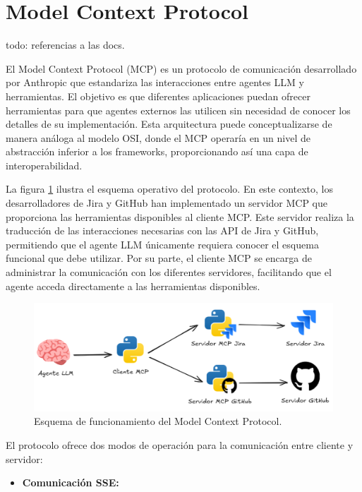 \section{Model Context Protocol}
todo: referencias a las docs.

El Model Context Protocol (MCP) es un protocolo de comunicación desarrollado por Anthropic que estandariza las interacciones entre agentes LLM y herramientas. El objetivo es que diferentes aplicaciones puedan ofrecer herramientas para que agentes externos las utilicen sin necesidad de conocer los detalles de su implementación. Esta arquitectura puede conceptualizarse de manera análoga al modelo OSI, donde el MCP operaría en un nivel de abstracción inferior a los frameworks, proporcionando así una capa de interoperabilidad.

La figura \ref{fig:mcp} ilustra el esquema operativo del protocolo. En este contexto, los desarrolladores de Jira y GitHub han implementado un servidor MCP que proporciona las herramientas disponibles al cliente MCP. Este servidor realiza la traducción de las interacciones necesarias con las API de Jira y GitHub, permitiendo que el agente LLM únicamente requiera conocer el esquema funcional que debe utilizar. Por su parte, el cliente MCP se encarga de administrar la comunicación con los diferentes servidores, facilitando que el agente acceda directamente a las herramientas disponibles.

\begin{figure}
  \centering
  \includegraphics[width=1\linewidth]{figures/mcp.png}
  \caption{Esquema de funcionamiento del Model Context Protocol.}
  \label{fig:mcp}
\end{figure}

El protocolo ofrece dos modos de operación para la comunicación entre cliente y servidor: 
\begin{itemize}
  \item{\textbf{Comunicación SSE: }}
\end{itemize}


